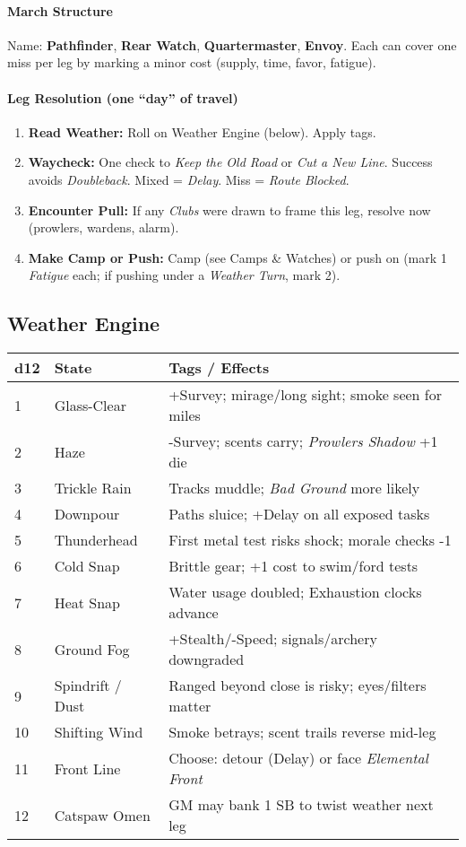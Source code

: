 \paragraph{March Structure}
Name: \textbf{Pathfinder}, \textbf{Rear Watch}, \textbf{Quartermaster}, \textbf{Envoy}.  
Each can cover one miss per leg by marking a minor cost (supply, time, favor, fatigue).

\paragraph{Leg Resolution (one “day” of travel)}
\begin{enumerate}
\item \textbf{Read Weather:} Roll on Weather Engine (below). Apply tags.
\item \textbf{Waycheck:} One check to \emph{Keep the Old Road} or \emph{Cut a New Line}. Success avoids \emph{Doubleback}. Mixed = \emph{Delay}. Miss = \emph{Route Blocked}.
\item \textbf{Encounter Pull:} If any \emph{Clubs} were drawn to frame this leg, resolve now (prowlers, wardens, alarm).
\item \textbf{Make Camp or Push:} Camp (see Camps \& Watches) or push on (mark 1 \emph{Fatigue} each; if pushing under a \emph{Weather Turn}, mark 2).
\end{enumerate}
\subsection*{Weather Engine}

\begin{tabular}{p{} p{} p{}}
\textbf{d12} & \textbf{State} & \textbf{Tags / Effects} \\
\hline
1 & Glass-Clear & +Survey; mirage/long sight; smoke seen for miles \\
2 & Haze & -Survey; scents carry; \emph{Prowlers Shadow} +1 die \\
3 & Trickle Rain & Tracks muddle; \emph{Bad Ground} more likely \\
4 & Downpour & Paths sluice; +Delay on all exposed tasks \\
5 & Thunderhead & First metal test risks shock; morale checks -1 \\
6 & Cold Snap & Brittle gear; +1 cost to swim/ford tests \\
7 & Heat Snap & Water usage doubled; Exhaustion clocks advance \\
8 & Ground Fog & +Stealth/-Speed; signals/archery downgraded \\
9 & Spindrift / Dust & Ranged beyond close is risky; eyes/filters matter \\
10 & Shifting Wind & Smoke betrays; scent trails reverse mid-leg \\
11 & Front Line & Choose: detour (Delay) or face \emph{Elemental Front} \\
12 & Catspaw Omen & GM may bank 1 SB to twist weather next leg \\
\end{tabular}

